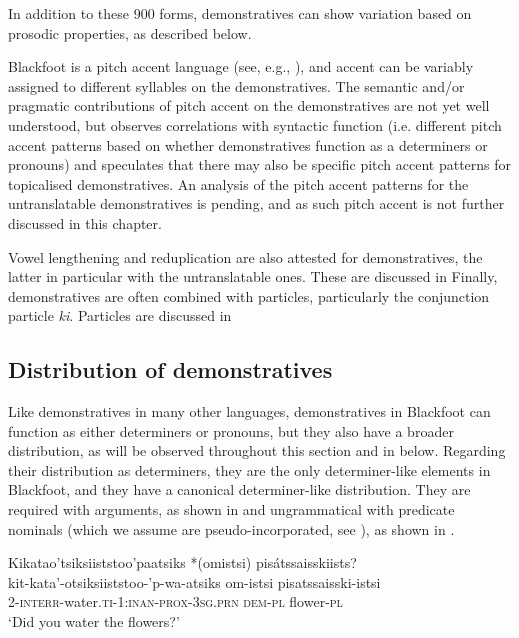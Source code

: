 \documentclass[output=paper,colorlinks,citecolor=brown]{langscibook}
\begin{document}
In addition to these 900 forms, demonstratives can show variation based on prosodic properties, as described below. 

Blackfoot is a pitch accent language (see, e.g., \citealt{VanDerMark2003}), and accent can be variably assigned to different syllables on the demonstratives. The semantic and/or pragmatic contributions of pitch accent on the demonstratives are not yet well understood, but \citet{Schupbach2013} observes correlations with syntactic function (i.e. different pitch accent patterns based on whether demonstratives function as a determiners or pronouns) and speculates that there may also be specific pitch accent patterns for topicalised demonstratives. An analysis of the pitch accent patterns for the untranslatable demonstratives is pending, and as such pitch accent is not further discussed in this chapter.

Vowel lengthening and reduplication are also attested for demonstratives, the latter in particular with the untranslatable ones. These are discussed in  Finally, demonstratives are often combined with particles, particularly the conjunction particle \textit{ki}. Particles are discussed in 


\subsection{Distribution of demonstratives}\label{sec:bliss:3.2}

Like demonstratives in many other languages, demonstratives in Blackfoot can function as either determiners or pronouns, but they also have a broader distribution, as will be observed throughout this section and in  below. Regarding their distribution as determiners, they are the only determiner-like elements in Blackfoot, and they have a canonical determiner-like distribution. They are required with arguments, as shown in  and ungrammatical with predicate nominals (which we assume are pseudo-incorporated, see \citealt{Bliss2018}), as shown in .

\ea\label{ex:bliss:2} {Kikatao’tsiksiiststoo’paatsiks *(omistsi) pisátssaisskiists?}\\
\gll kit-kata’-otsiksiiststoo-’p-wa-atsiks om-istsi pisatssaisski-istsi\\
     2-\textsc{interr}-water.\textsc{ti-1:inan-prox-3sg.prn} \textsc{dem-pl} flower-\textsc{pl}\\
\glt ‘Did you water the flowers?’
\z
\end{document}
